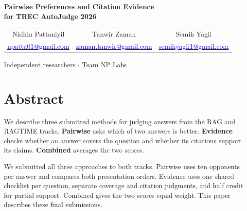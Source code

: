 \documentclass[11pt,letterpaper]{article}
\begin{document}
\begin{center}
{\Large\bfseries Pairwise Preferences and Citation Evidence\\for TREC AutoJudge 2026\par}
\vspace{8pt}
\begin{tabular}{ccc}
Nidhin Pattaniyil & Tanwir Zaman & Semih Yagli\\[3pt]
{\small\href{mailto:npatta01@gmail.com}{\textcolor{blue}{npatta01@gmail.com}}} &
{\small\href{mailto:zaman.tanwir@gmail.com}{\textcolor{blue}{zaman.tanwir@gmail.com}}} &
{\small\href{mailto:semihyagli1@gmail.com}{\textcolor{blue}{semihyagli1@gmail.com}}}
\end{tabular}
\par\vspace{3pt}
Independent researchers $\cdot$ Team NP Labs
\end{center}
\section*{Abstract}
We describe three submitted methods for judging answers from the RAG and RAGTIME tracks. \textbf{Pairwise} asks which of two answers is better. \textbf{Evidence} checks whether an answer covers the question and whether its citations support its claims. \textbf{Combined} averages the two scores.

We submitted all three approaches to both tracks. Pairwise uses ten opponents per answer and compares both presentation orders. Evidence uses one shared checklist per question, separate coverage and citation judgments, and half credit for partial support. Combined gives the two scores equal weight. This paper describes these final submissions.
\end{document}
